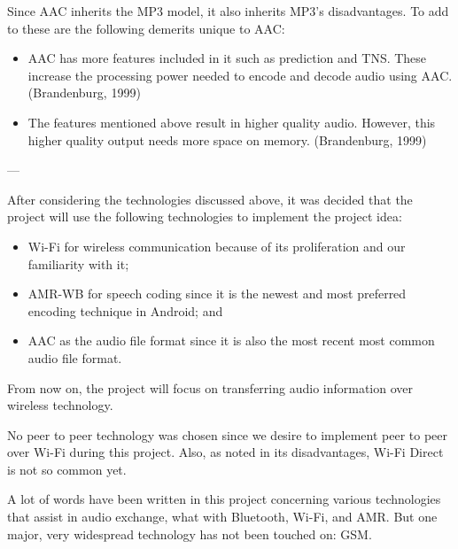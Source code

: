 \documentclass[12pt,svgnames,smaller]{article} %
\begin{document}
\begin{enumerate}
		Since AAC inherits the MP3 model, it also inherits MP3’s disadvantages. To add to these are the following demerits unique to AAC:
		
		\begin{itemize}
			\item AAC has more features included in it such as prediction and TNS. These increase the processing power needed to encode and decode audio using AAC. (Brandenburg, 1999)
			\item The features mentioned above result in higher quality audio. However, this higher quality output needs more space on memory. (Brandenburg, 1999)
		\end{itemize}
		
		
	\end{enumerate}
	
	
	
	\begin{center}
		---
	\end{center}
	
	After considering the technologies discussed above, it was decided that the project will use the following technologies to implement the project idea:
	
	\begin{itemize}
		\item Wi-Fi for wireless communication because of its proliferation and our familiarity with it;
		\item AMR-WB for speech coding since it is the newest and most preferred encoding technique in Android; and
		\item AAC as the audio file format since it is also the most recent most common audio file format.
	\end{itemize}
	
	From now on, the project will focus on transferring audio information over wireless technology.
	
	No peer to peer technology was chosen since we desire to implement peer to peer over Wi-Fi during this project. Also, as noted in its disadvantages, Wi-Fi Direct is not so common yet.
	
	A lot of words have been written in this project concerning various technologies that assist in audio exchange, what with Bluetooth, Wi-Fi, and AMR. But one major, very widespread technology has not been touched on: GSM.
	
\end{document}
